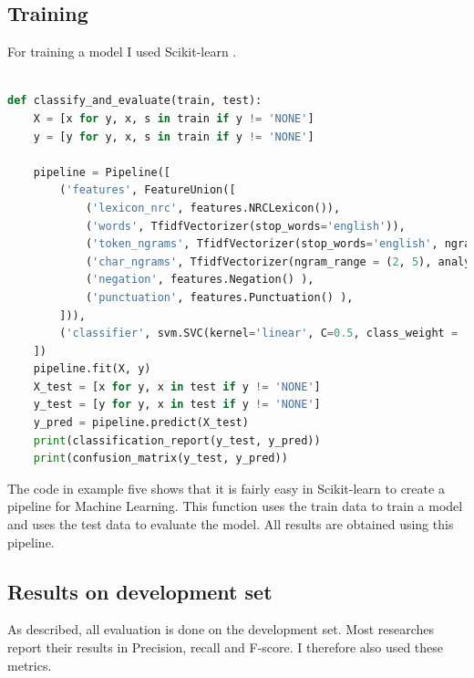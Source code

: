 \documentclass[
10pt, %
a4paper, %
oneside, %
headinclude,footinclude, %
BCOR5mm, %
]{scrartcl}
\begin{document}
\subsection{Training}
For training a model I used Scikit-learn \citep{scikit-learn}. 
\begin{lstlisting}[language=python, caption=Training a emotion classifier, label=trainmodel_py]

def classify_and_evaluate(train, test):
    X = [x for y, x, s in train if y != 'NONE']
    y = [y for y, x, s in train if y != 'NONE']

    pipeline = Pipeline([
        ('features', FeatureUnion([
            ('lexicon_nrc', features.NRCLexicon()),
            ('words', TfidfVectorizer(stop_words='english')),
            ('token_ngrams', TfidfVectorizer(stop_words='english', ngram_range = (2, 5))),
            ('char_ngrams', TfidfVectorizer(ngram_range = (2, 5), analyzer = 'char')),
            ('negation', features.Negation() ),  
            ('punctuation', features.Punctuation() ),  
        ])),
        ('classifier', svm.SVC(kernel='linear', C=0.5, class_weight = 'balanced'))
    ])
    pipeline.fit(X, y)
    X_test = [x for y, x in test if y != 'NONE']
    y_test = [y for y, x in test if y != 'NONE']
    y_pred = pipeline.predict(X_test)
    print(classification_report(y_test, y_pred))
    print(confusion_matrix(y_test, y_pred))
\end{lstlisting}
The code in example five shows that it is fairly easy in Scikit-learn to create a pipeline for Machine Learning. This function uses the train data to train a model and uses the test data to evaluate the model. All results are obtained using this pipeline.

\subsection{Results on development set}
As described, all evaluation is done on the development set. Most researches report their results in Precision, recall and F-score. I therefore also used these metrics. 
\end{document}
